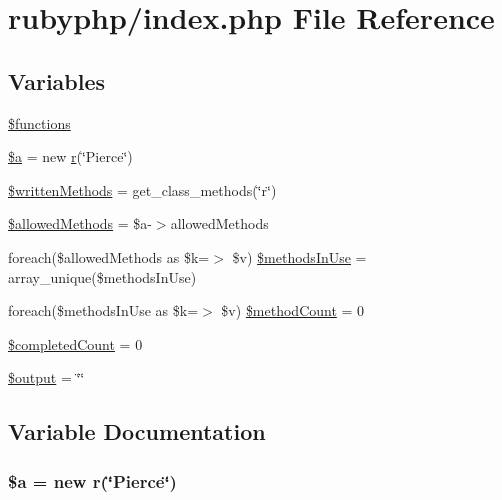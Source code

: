 \hypertarget{index_8php}{\section{rubyphp/index.php File Reference}
\label{index_8php}
}
\subsection*{Variables}
\begin{DoxyCompactItemize}
\item 
\hyperlink{index_8php_aa75daea491817f3b64daa2f51128bcdf}{\$functions}
\item 
\hyperlink{index_8php_acebf83966ef6d7e5645a6b62ba368f9f}{\$a} = new \hyperlink{classr}{r}(\char`\"{}Pierce\char`\"{})
\item 
\hyperlink{index_8php_a2e64f0494f7eccf90168af7f67198650}{\$written\-Methods} = get\-\_\-class\-\_\-methods(\char`\"{}r\char`\"{})
\item 
\hyperlink{index_8php_ab278eba7cab5341dacdccecd7a2cc2df}{\$allowed\-Methods} = \$a-\/$>$allowed\-Methods
\item 
foreach(\$allowed\-Methods as \$k=$>$ \$v) \hyperlink{index_8php_a1c475c0c53206fb15c4c3028bb7d5c7c}{\$methods\-In\-Use} = array\-\_\-unique(\$methods\-In\-Use)
\item 
foreach(\$methods\-In\-Use as \$k=$>$ \$v) \hyperlink{index_8php_a56c1b7384519355df73a254a12f0bae3}{\$method\-Count} = 0
\item 
\hyperlink{index_8php_a51c734a41c7747051953ec3d78dd1c5b}{\$completed\-Count} = 0
\item 
\hyperlink{index_8php_a3b3e916294d02621688f0b1b64f95628}{\$output} = \char`\"{}\char`\"{}
\end{DoxyCompactItemize}


\subsection{Variable Documentation}
\hypertarget{index_8php_acebf83966ef6d7e5645a6b62ba368f9f}{
\subsubsection[{\$a}]{\setlength{\rightskip}{0pt plus 5cm}\$a = new {\bf r}(\char`\"{}Pierce\char`\"{})}}\label{index_8php_acebf83966ef6d7e5645a6b62ba368f9f}


